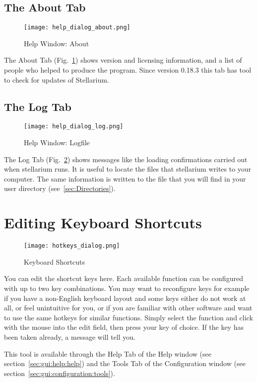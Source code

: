 \subsection{The About Tab}
\label{sec:gui:help:about}
\begin{figure}[htbp]
\centering\texttt{[image: help\_dialog\_about.png]}
\caption{Help Window: About}
\label{fig:gui:help:about}
\end{figure}

The About Tab (Fig.~\ref{fig:gui:help:about}) shows version and licensing information, and a list of people who helped to produce the program.
Since version 0.18.3  this tab has tool to check for updates of Stellarium.

\subsection{The Log Tab}
\label{sec:gui:help:log}
\begin{figure}[htbp]
\centering\texttt{[image: help\_dialog\_log.png]}
\caption{Help Window: Logfile}
\label{fig:gui:help:log}
\end{figure}

The Log Tab (Fig.~\ref{fig:gui:help:log}) shows messages like the loading confirmations carried out when
stellarium runs. It is useful to locate the files that stellarium writes
to your computer. The same information is written to  the file  that you will
find in your user directory (see~\ref{sec:Directories}).

\section{Editing Keyboard Shortcuts}
\label{sec:gui:help:hotkeys}

\begin{figure}[htbp]
\centering\texttt{[image: hotkeys\_dialog.png]}
\caption{Keyboard Shortcuts}
\label{fig:gui:hotkeys}
\end{figure}

You can edit the shortcut keys here. Each available function can be
configured with up to two key combinations. You may want to
reconfigure keys for example if you have a non-English keyboard layout
and some keys either do not work at all, or feel unintuitive for you,
or if you are familiar with other software and want to use the same
hotkeys for similar functions. Simply select the function and click
with the mouse into the edit field, then press your key of choice. If
the key has been taken already, a message will tell you.

This tool is available through the Help Tab of the Help window (see section~\ref{sec:gui:help:help}) and the
Tools Tab of the Configuration window (see section~\ref{sec:gui:configuration:tools}).


